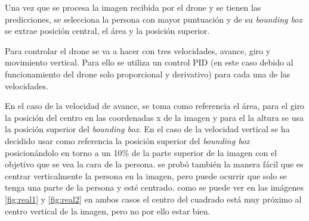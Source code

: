 Una vez que se procesa la imagen recibida por el drone y se tienen las predicciones, se selecciona la persona con mayor puntuación y de su \textit{bounding box} se extrae posición central, el área y la posición superior.

Para controlar el drone se va a hacer con tres velocidades, avance, giro y movimiento vertical. Para ello se utiliza un control PID (en este caso debido al funcionamiento del drone solo proporcional y derivativo) para cada una de las velocidades.

En el caso de la velocidad de avance, se toma como referencia el área, para el giro la posición del centro en las coordenadas x de la imagen y para el la altura se usa la posición superior del \textit{bounding box}.
En el caso de la velocidad vertical se ha decidido usar como referencia la posición superior del \textit{bounding box} posicionándolo en torno a un 10\% de la parte superior de la imagen con el objetivo que se vea la cara de la persona. se probó también la manera fácil que es centrar verticalmente la persona en la imagen, pero puede ocurrir que solo se tenga una parte de la persona y esté centrado. como se puede ver en las imágenes \ref{fig:real1} y \ref{fig:real2} en ambos casos el centro del cuadrado está muy próximo al centro vertical de la imagen, pero no por ello estar bien.

